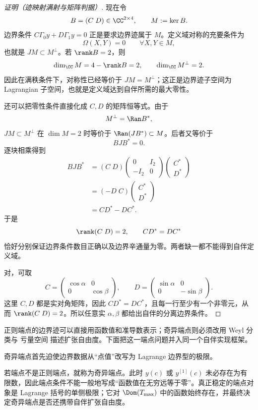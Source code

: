 \begin{proof}[证明（迹映射满射与矩阵判据）]
现在令
\[
 B=(C\;D)\in\CC^{2\times4},
 \qquad
 M:=\ker B.
\]
边界条件 $C\Gamma_0y+D\Gamma_1y=0$ 正是要求边界迹属于 $M$。定义域对称的充要条件为
\[
 \Omega(X,Y)=0
 \qquad \forall X,Y\in M,
\]
也就是 $JM\subset M^\perp$。若 $\rank B=2$，则
\[
 \dim_\CC M=4-\rank B=2,
 \qquad
 \dim_\CC M^\perp=2.
\]
因此在满秩条件下，对称性已经等价于 $JM=M^\perp$；这正是边界迹子空间为 Lagrangian 子空间，也就是定义域达到自伴所需的最大零性。

还可以把零性条件直接化成 $C,D$ 的矩阵恒等式。由于
\[
 M^\perp=\Ran B^*,
\]
$JM\subset M^\perp$ 在 $\dim M=2$ 时等价于 $\Ran(JB^*)\subset M$。后者又等价于
\[
 BJB^*=0.
\]
逐块相乘得到
\[
\begin{aligned}
 BJB^*
 &=(C\;D)
 \begin{pmatrix}0&I_2\\-I_2&0\end{pmatrix}
 \begin{pmatrix}C^*\\D^*\end{pmatrix}\\
 &=(-D\;C)
 \begin{pmatrix}C^*\\D^*\end{pmatrix}\\
 &=CD^*-DC^*.
\end{aligned}
\]
于是
\[
 \rank(C\;D)=2,
 \qquad
 CD^*=DC^*
\]
恰好分别保证边界条件数目正确以及边界辛通量为零。两者缺一都不能得到自伴定义域。

对，可取
\[
 C=\begin{pmatrix}\cos\alpha&0\\0&\cos\beta\end{pmatrix},
 \qquad
 D=\begin{pmatrix}\sin\alpha&0\\0&-\sin\beta\end{pmatrix}.
\]
这里 $C,D$ 都是实对角矩阵，因此 $CD^*=DC^*$，且每一行至少有一个非零元，从而 $\rank(C\;D)=2$。所以任意实 $\alpha,\beta$ 都给出自伴的分离边界条件。
\end{proof}

正则端点的边界迹可以直接用函数值和准导数表示；奇异端点则必须改用 Weyl 分类与 亏量空间 描述扩张自由度。下面把这一端点问题并入同一个自伴实现框架。

奇异端点首先迫使边界数据从“点值”改写为 Lagrange 边界型的极限。

若端点不是正则端点，就称为奇异端点。此时 $y(c)$ 或 $y^{[1]}(c)$ 未必存在为有限数，因此端点条件不能一般地写成“函数值在无穷远等于零”。真正稳定的端点对象是 Lagrange 括号的单侧极限；它对 $\Dom(T_{\max})$ 中的函数始终存在，并最终决定奇异端点是否还携带自伴扩张自由度。

